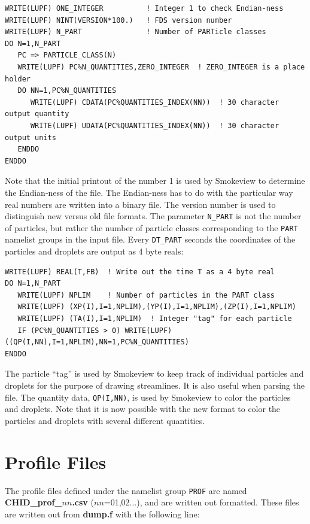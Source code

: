 \documentclass[11pt]{book}
\newcommand{\ct}{\tt\small}
\begin{document}
\footnotesize
\begin{verbatim}
WRITE(LUPF) ONE_INTEGER          ! Integer 1 to check Endian-ness
WRITE(LUPF) NINT(VERSION*100.)   ! FDS version number
WRITE(LUPF) N_PART               ! Number of PARTicle classes
DO N=1,N_PART
   PC => PARTICLE_CLASS(N)
   WRITE(LUPF) PC%N_QUANTITIES,ZERO_INTEGER  ! ZERO_INTEGER is a place holder
   DO NN=1,PC%N_QUANTITIES
      WRITE(LUPF) CDATA(PC%QUANTITIES_INDEX(NN))  ! 30 character output quantity
      WRITE(LUPF) UDATA(PC%QUANTITIES_INDEX(NN))  ! 30 character output units
   ENDDO
ENDDO
\end{verbatim}
\normalsize
Note that the initial printout of the number 1 is used by Smokeview to determine the
Endian-ness of the file. The Endian-ness has to do with the particular way real numbers are written into a binary file.
The version number is used to distinguish new versus old file formats.
The parameter {\ct N\_PART} is not the number of particles, but rather the number of
particle classes corresponding to the {\ct PART} namelist groups in the input file.
Every {\ct DT\_PART} seconds the coordinates of the particles and droplets are output as 4 byte reals:

\footnotesize
\begin{verbatim}
WRITE(LUPF) REAL(T,FB)  ! Write out the time T as a 4 byte real
DO N=1,N_PART
   WRITE(LUPF) NPLIM    ! Number of particles in the PART class
   WRITE(LUPF) (XP(I),I=1,NPLIM),(YP(I),I=1,NPLIM),(ZP(I),I=1,NPLIM)
   WRITE(LUPF) (TA(I),I=1,NPLIM)  ! Integer "tag" for each particle
   IF (PC%N_QUANTITIES > 0) WRITE(LUPF) ((QP(I,NN),I=1,NPLIM),NN=1,PC%N_QUANTITIES)
ENDDO
\end{verbatim}
\normalsize
The particle ``tag'' is used by Smokeview to keep track of individual particles and droplets for the purpose of drawing
streamlines. It is also useful when parsing the file. The quantity data, {\ct QP(I,NN)}, is used by Smokeview to color
the particles and droplets. Note that it is now possible with the new format to color the particles and droplets with
several different quantities.

\section{Profile Files}
\label{out:PROF}

The profile files defined under the namelist group {\ct PROF} are
named {\bf CHID\_prof\_$nn$.csv} ($nn$=01,02...),
and are written out formatted. These files are written out from {\bf
dump.f} with the following line:
\end{document}
